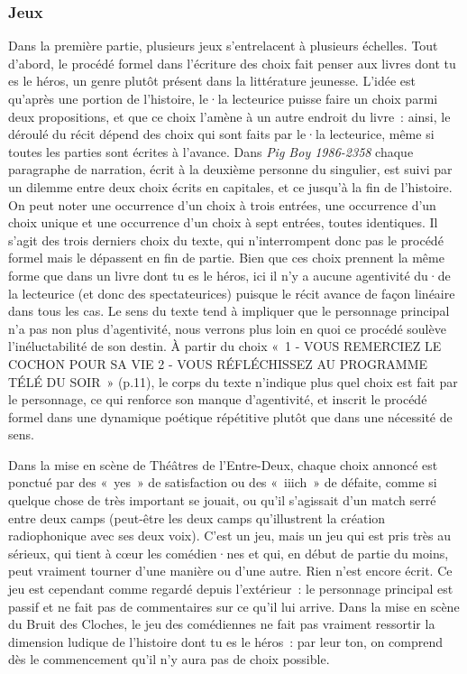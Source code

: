 \documentclass[
]{article}
\begin{document}
\subsubsection{Jeux}\label{jeux}

Dans la première partie, plusieurs jeux s'entrelacent à plusieurs échelles. Tout d'abord, le procédé formel dans l'écriture des choix fait penser aux livres dont tu es le héros, un genre plutôt présent dans la littérature jeunesse. L'idée est qu'après une portion de l'histoire, le·la lecteurice puisse faire un choix parmi deux propositions, et que ce choix l'amène à un autre endroit du livre~: ainsi, le déroulé du récit dépend des choix qui sont faits par le·la lecteurice, même si toutes les parties sont écrites à l'avance. Dans \emph{Pig Boy 1986-2358} chaque paragraphe de narration, écrit à la deuxième personne du singulier, est suivi par un dilemme entre deux choix écrits en capitales, et ce jusqu'à la fin de l'histoire. On peut noter une occurrence d'un choix à trois entrées, une occurrence d'un choix unique et une occurrence d'un choix à sept entrées, toutes identiques. Il s'agit des trois derniers choix du texte, qui n'interrompent donc pas le procédé formel mais le dépassent en fin de partie. Bien que ces choix prennent la même forme que dans un livre dont tu es le héros, ici il n'y a aucune agentivité du·de la lecteurice (et donc des spectateurices) puisque le récit avance de façon linéaire dans tous les cas. Le sens du texte tend à impliquer que le personnage principal n'a pas non plus d'agentivité, nous verrons plus loin en quoi ce procédé soulève l'inéluctabilité de son destin. À partir du choix «~1 - VOUS REMERCIEZ LE COCHON POUR SA VIE 2 - VOUS RÉFLÉCHISSEZ AU PROGRAMME TÉLÉ DU SOIR~» (p.11), le corps du texte n'indique plus quel choix est fait par le personnage, ce qui renforce son manque d'agentivité, et inscrit le procédé formel dans une dynamique poétique répétitive plutôt que dans une nécessité de sens.

Dans la mise en scène de Théâtres de l'Entre-Deux, chaque choix annoncé est ponctué par des «~yes~» de satisfaction ou des «~iiich~» de défaite, comme si quelque chose de très important se jouait, ou qu'il s'agissait d'un match serré entre deux camps (peut-être les deux camps qu'illustrent la création radiophonique avec ses deux voix). C'est un jeu, mais un jeu qui est pris très au sérieux, qui tient à cœur les comédien·nes et qui, en début de partie du moins, peut vraiment tourner d'une manière ou d'une autre. Rien n'est encore écrit. Ce jeu est cependant comme regardé depuis l'extérieur~: le personnage principal est passif et ne fait pas de commentaires sur ce qu'il lui arrive. Dans la mise en scène du Bruit des Cloches, le jeu des comédiennes ne fait pas vraiment ressortir la dimension ludique de l'histoire dont tu es le héros~: par leur ton, on comprend dès le commencement qu'il n'y aura pas de choix possible.
\end{document}
